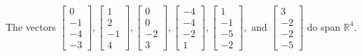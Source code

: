\begin{exercise}
\begin{exerciseStatement}
  \end{exerciseStatement}
  \begin{exerciseAnswer}
   The vectors \(\left[\begin{array}{r}
0 \\
-1 \\
-4 \\
-3
\end{array}\right] , \left[\begin{array}{r}
1 \\
2 \\
-1 \\
4
\end{array}\right] , \left[\begin{array}{r}
0 \\
0 \\
-2 \\
3
\end{array}\right] , \left[\begin{array}{r}
-4 \\
-4 \\
-2 \\
1
\end{array}\right] , \left[\begin{array}{r}
1 \\
-1 \\
-5 \\
-2
\end{array}\right] , \text{ and } \left[\begin{array}{r}
3 \\
-2 \\
-2 \\
-5
\end{array}\right]\) 
  	 do  
	span \(\mathbb{R}^4\).
  


  \end{exerciseAnswer}
\end{exercise}